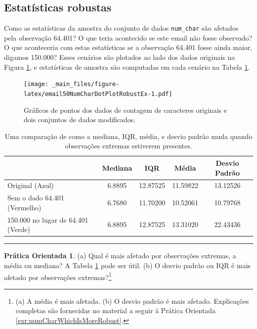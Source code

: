 \documentclass[
]{book}
\theoremstyle{definition}
\theoremstyle{definition}
\theoremstyle{definition}
\newtheorem{exercise}{Prática Orientada}[chapter]
\theoremstyle{definition}
\theoremstyle{remark}
\begin{document}
\hypertarget{statisticsRobust}{%
\subsection{Estatísticas robustas}\label{statisticsRobust}}

Como as estatísticas da amostra do conjunto de dados \texttt{num\_char} são afetados pela observação 64.401? O que teria acontecido se este email não fosse observado? O que aconteceria com estas estatísticas se a observação 64.401 fosse ainda maior, digamos 150.000? Esses cenários são plotados ao lado dos dados originais na Figura \ref{fig:email50NumCharDotPlotRobustEx}, e estatísticas de amostra são computadas em cada cenário na Tabela \ref{tab:robustOrNotTable}.

\begin{figure}
\centering
\texttt{[image: \_main\_files/figure-latex/email50NumCharDotPlotRobustEx-1.pdf]}
\caption{\label{fig:email50NumCharDotPlotRobustEx}Gráficos de pontos dos dados de contagem de caracteres originais e dois conjuntos de dados modificados.}
\end{figure}

\begin{table}

\caption{\label{tab:robustOrNotTable}Uma comparação de como a mediana, IQR, média, e desvio padrão muda quando observações extremas estiverem presentes.}
\centering
\begin{tabular}[t]{l|c|c|c|c}
\hline
  & Mediana & IQR & Média & Desvio Padrão\\
\hline
Original (Azul) & 6.8895 & 12.87525 & 11.59822 & 13.12526\\
\hline
Sem o dado 64.401 (Vermelho) & 6.7680 & 11.70200 & 10.52061 & 10.79768\\
\hline
150.000 no lugar de 64.401 (Verde) & 6.8895 & 12.87525 & 13.31020 & 22.43436\\
\hline
\end{tabular}
\end{table}

\begin{center}\rule{0.5\linewidth}{0.5pt}\end{center}

\begin{exercise}
\protect\hypertarget{exr:numCharWhichIsMoreRobust}{}{\label{exr:numCharWhichIsMoreRobust} }(a) Qual é mais afetado por observações extremas, a média ou mediana? A Tabela \ref{tab:robustOrNotTable} pode ser útil.
(b) O desvio padrão ou IQR é mais afetado por observações extremas?\footnote{(a) A média é mais afetada. (b) O desvio padrão é mais afetado. Explicações completas são fornecidas no material a seguir à Prática Orientada \ref{exr:numCharWhichIsMoreRobust}.}
\end{exercise}
\end{document}
